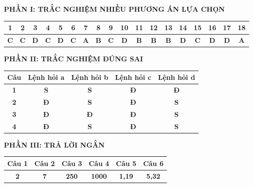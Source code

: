 \documentclass[11pt,a4paper]{article}
\begin{document}
\vspace{0.2cm}
\noindent\textbf{\color{mainGreen}PHẦN I: TRẮC NGHIỆM NHIỀU PHƯƠNG ÁN LỰA CHỌN}
\begin{center}
\renewcommand{\arraystretch}{1.2}
\begin{tabular}{|c|c|c|c|c|c|c|c|c|c|c|c|c|c|c|c|c|c|}
\hline
\textbf{1} & \textbf{2} & \textbf{3} & \textbf{4} & \textbf{5} & \textbf{6} & \textbf{7} & \textbf{8} & \textbf{9} & \textbf{10} & \textbf{11} & \textbf{12} & \textbf{13} & \textbf{14} & \textbf{15} & \textbf{16} & \textbf{17} & \textbf{18} \\ \hline
\textbf{\color{red}C} & \textbf{\color{red}C} & \textbf{\color{red}D} & \textbf{\color{red}C} & \textbf{\color{red}D} & \textbf{\color{red}C} & \textbf{\color{red}A} & \textbf{\color{red}B} & \textbf{\color{red}C} & \textbf{\color{red}D} & \textbf{\color{red}B} & \textbf{\color{red}B} & \textbf{\color{red}B} & \textbf{\color{red}D} & \textbf{\color{red}C} & \textbf{\color{red}D} & \textbf{\color{red}D} & \textbf{\color{red}A} \\ \hline
\end{tabular}
\end{center}

\vspace{0.3cm}
\noindent\textbf{\color{mainGreen}PHẦN II: TRẮC NGHIỆM ĐÚNG SAI}
\begin{center}
\renewcommand{\arraystretch}{1.2}
\begin{tabular}{|c|c|c|c|c|}
\hline
\textbf{Câu} & \textbf{Lệnh hỏi a} & \textbf{Lệnh hỏi b} & \textbf{Lệnh hỏi c} & \textbf{Lệnh hỏi d} \\ \hline
\textbf{1} & \textbf{S} & \textbf{S} & \textbf{\color{red}Đ} & \textbf{\color{red}Đ} \\ \hline
\textbf{2} & \textbf{\color{red}Đ} & \textbf{S} & \textbf{\color{red}Đ} & \textbf{S} \\ \hline
\textbf{3} & \textbf{\color{red}Đ} & \textbf{\color{red}Đ} & \textbf{\color{red}Đ} & \textbf{S} \\ \hline
\textbf{4} & \textbf{\color{red}Đ} & \textbf{S} & \textbf{\color{red}Đ} & \textbf{S} \\ \hline
\end{tabular}
\end{center}

\vspace{0.3cm}
\noindent\textbf{\color{mainGreen}PHẦN III: TRẢ LỜI NGẮN}
\begin{center}
\renewcommand{\arraystretch}{1.2}
\begin{tabular}{|c|c|c|c|c|c|}
\hline
\textbf{Câu 1} & \textbf{Câu 2} & \textbf{Câu 3} & \textbf{Câu 4} & \textbf{Câu 5} & \textbf{Câu 6} \\ \hline
\textbf{\color{red}2} & \textbf{\color{red}7} & \textbf{\color{red}250} & \textbf{\color{red}1000} & \textbf{\color{red}1,19} & \textbf{\color{red}5,32} \\ \hline
\end{tabular}
\end{center}
\end{document}

